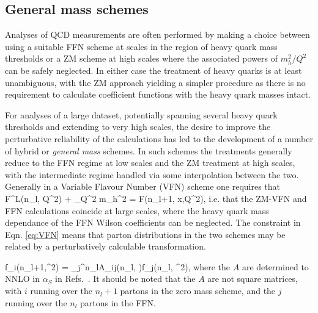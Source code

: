 \subsection{General mass schemes}

Analyses of QCD measurements are often performed by making a choice between using a suitable FFN scheme at scales in the region of heavy quark mass thresholds or a ZM scheme at high scales where the associated powers of $m_h^2/Q^2$ can be safely neglected. In either case the treatment of heavy quarks is at least unambiguous, with the ZM approach yielding a simpler procedure as there is no requirement to calculate coefficient functions with the heavy quark masses intact.

For analyses of a large dataset, potentially spanning several heavy quark thresholds and extending to very high scales, the desire to improve the perturbative reliability of the calculations has led to the development of a number of hybrid or \emph{general mass} schemes. In such schemes the treatments generally reduce to the FFN regime at low scales and the ZM treatment at high scales, with the intermediate regime handled via some interpolation between the two. Generally in a Variable Flavour Number (VFN) scheme one requires that
\be F^{L}(n_l, Q^2) + \lim_{Q^2 \gg m_h^2} \left[ F^{H}(n_l, Q^2,m_h^2)\right] =  F(n_l+1, x,Q^2), \label{eq:VFN}\ee
i.e. that the ZM-VFN and FFN calculations coincide at large scales, where the heavy quark mass dependance of the FFN Wilson coefficients can be neglected. The constraint in Eqn. \ref{eq:VFN} means that parton distributions in the two schemes may be related by a perturbatively calculable transformation.

\be f_i(n_l+1,\mu^2) = \sum_j^{n_l}A_{ij}\left(n_l, \right)\otimes f_j(n_l, \mu^2), \label{eq:FLVreln}\ee
where the $A$ are determined to NNLO in $\alpha_S$ in Refs.~\cite{Buza:1995ie,Buza:1996wv}. It should be noted that the $A$ are not square matrices, with $i$ running over the $n_l+1$ partons in the zero mass scheme, and the $j$ running over the $n_l$ partons in the FFN.

